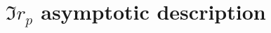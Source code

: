 \documentclass[11pt]{article}
\begin{document}
	\section{$\Im{r_p}$ asymptotic description} \label{sec:imrpasymptotic}

	

	\newpage
	\listoftodos
	\newpage
	\printbibliography
\end{document}
